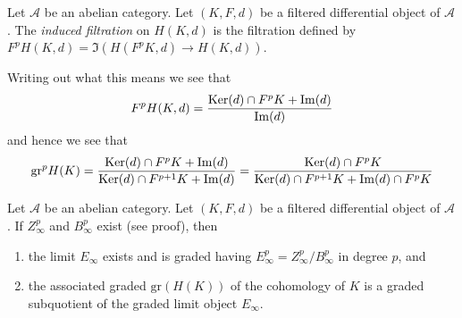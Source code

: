 \begin{definition}
\label{definition-filtration-cohomology-filtered-differential}
Let $\mathcal{A}$ be an abelian category.
Let $(K, F, d)$ be a filtered differential object of $\mathcal{A}$.
The {\it induced filtration} on $H(K, d)$ is the filtration defined
by $F^pH(K, d) = \Im(H(F^pK, d) \to H(K, d))$.
\end{definition}

\noindent
Writing out what this means we see that
$$
F^pH(K, d) =
\frac{\mathop{\mathrm{Ker}}(d) \cap F^pK + \mathop{\mathrm{Im}}(d)}{\mathop{\mathrm{Im}}(d)}
$$
and hence we see that
$$
\text{gr}^p H(K) =
\frac{\mathop{\mathrm{Ker}}(d) \cap F^pK + \mathop{\mathrm{Im}}(d)}{\mathop{\mathrm{Ker}}(d) \cap F^{p + 1}K + \mathop{\mathrm{Im}}(d)} =
\frac{\mathop{\mathrm{Ker}}(d) \cap F^pK}{\mathop{\mathrm{Ker}}(d) \cap F^{p + 1}K + \mathop{\mathrm{Im}}(d) \cap F^pK}
$$

\begin{lemma}
\label{lemma-compute-filtered-cohomology}
Let $\mathcal{A}$ be an abelian category. Let $(K, F, d)$ be a filtered
differential object of $\mathcal{A}$. If $Z_\infty^p$ and $B_\infty^p$
exist (see proof), then
\begin{enumerate}
\item the limit $E_\infty$ exists and is graded having
$E_\infty^p = Z_\infty^p/B_\infty^p$ in degree $p$, and
\item the associated graded $\text{gr}(H(K))$ of the cohomology of $K$
is a graded subquotient of the graded limit object $E_\infty$.
\end{enumerate}
\end{lemma}

